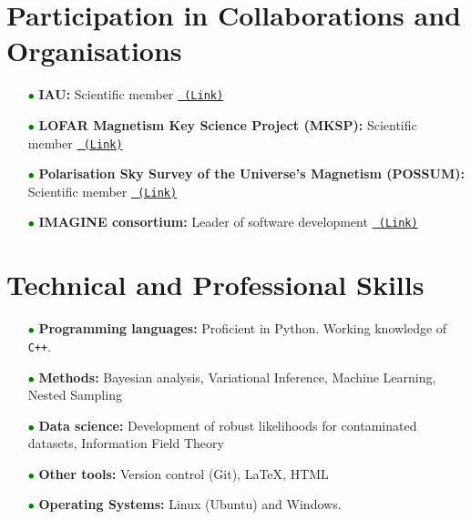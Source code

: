 \documentclass[11pt,a4paper,sans, table, dvipsnames]{moderncv}        %
\begin{document}
\vspace{\baselineskip}
\section{Participation in Collaborations and Organisations}
\begin{itemize}
\item[\textcolor{Green}{$\bullet$}] \textbf{IAU: }Scientific member \href{https://www.iau.org/administration/membership/individual/19962/}{\texttt{\color{blue} (Link)}}
\item[\textcolor{Green}{$\bullet$}] \textbf{LOFAR Magnetism Key Science Project (MKSP): } Scientific member \href{https://lofar-mksp.org/people/}{\texttt{\color{blue} (Link)}}
\item[\textcolor{Green}{$\bullet$}] \textbf{Polarisation Sky Survey of the Universe's Magnetism (POSSUM): } Scientific member \href{https://possum-survey.org/members/}{\texttt{\color{blue} (Link)}}
\item[\textcolor{Green}{$\bullet$}] \textbf{IMAGINE consortium: } Leader of software development \href{https://www.astro.ru.nl/imagine/index.html}{\texttt{\color{blue} (Link)}}
\end{itemize}


\vspace{\baselineskip}
\section{Technical and Professional Skills}
\begin{itemize}

\item[\textcolor{Green}{$\bullet$}] \textbf{Programming languages:} Proficient in Python. Working knowledge of \texttt{C++}.

\vspace{5pt}

\item[\textcolor{Green}{$\bullet$}] \textbf{Methods:} Bayesian analysis, Variational Inference, Machine Learning, Nested Sampling

\vspace{5pt}

\item[\textcolor{Green}{$\bullet$}] \textbf{Data science:}  Development of robust likelihoods for contaminated datasets, Information Field Theory

\vspace{5pt}

\item[\textcolor{Green}{$\bullet$}] \textbf{Other tools:} Version control (Git), \LaTeX{}, HTML

\vspace{5pt}

\item[\textcolor{Green}{$\bullet$}] \textbf{Operating Systems:} Linux (Ubuntu) and Windows.

\end{itemize}
\end{document}
